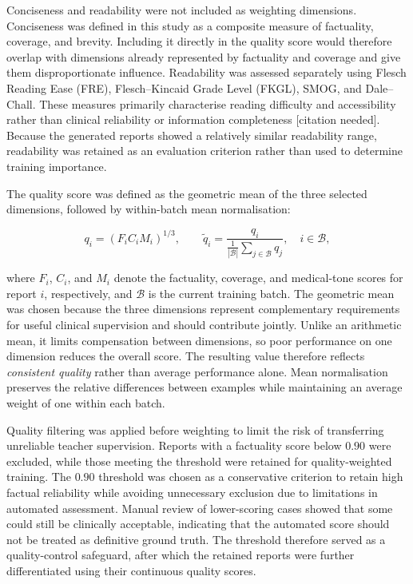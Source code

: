 \documentclass[ %
                    author={Aman Kumar Singh},
                supervisor={Dr. Edwin Simpson},
                    degree={MSc},
                     title={Quality-Aware Knowledge Distillation of Large Language Models for Efficient Personalised Clinical Report Generation},
                  subtitle={},
                      type={},
                      year={2021}]{dissertation}
\begin{document}
Conciseness and readability were not included as weighting dimensions.
Conciseness was defined in this study as a composite measure of factuality,
coverage, and brevity. Including it directly in the quality score would
therefore overlap with dimensions already represented by factuality and
coverage and give them disproportionate influence.
Readability was assessed separately using Flesch Reading Ease (FRE),
Flesch--Kincaid Grade Level (FKGL), SMOG, and Dale--Chall. These measures
primarily characterise reading difficulty and accessibility rather than
clinical reliability or information completeness [citation needed].
Because the generated reports showed a relatively similar readability
range, readability was retained as an evaluation criterion rather than used
to determine training importance.

The quality score was defined as the geometric mean of the three selected
dimensions, followed by within-batch mean normalisation:

\begin{equation}
q_i=(F_iC_iM_i)^{1/3},
\qquad
\tilde q_i=
\frac{q_i}
{\frac{1}{|\mathcal{B}|}\sum_{j\in\mathcal{B}}q_j},
\quad i\in\mathcal{B},
\label{eq:quality_score}
\end{equation}

where $F_i$, $C_i$, and $M_i$ denote the factuality, coverage, and
medical-tone scores for report $i$, respectively, and $\mathcal{B}$ is the
current training batch. The geometric mean was chosen because the three
dimensions represent complementary requirements for useful clinical
supervision and should contribute jointly. Unlike an arithmetic mean, it
limits compensation between dimensions, so poor performance on one
dimension reduces the overall score. The resulting value therefore reflects
\textit{consistent quality} rather than average performance alone. Mean
normalisation preserves the relative differences between examples while
maintaining an average weight of one within each batch.

Quality filtering was applied before weighting to limit the risk of
transferring unreliable teacher supervision. Reports with a factuality score
below $0.90$ were excluded, while those meeting the threshold were retained
for quality-weighted training. The $0.90$ threshold was chosen as a
conservative criterion to retain high factual reliability while avoiding
unnecessary exclusion due to limitations in automated assessment. Manual
review of lower-scoring cases showed that some could still be clinically
acceptable, indicating that the automated score should not be treated as
definitive ground truth. The threshold therefore served as a quality-control
safeguard, after which the retained reports were further differentiated
using their continuous quality scores.
\end{document}
